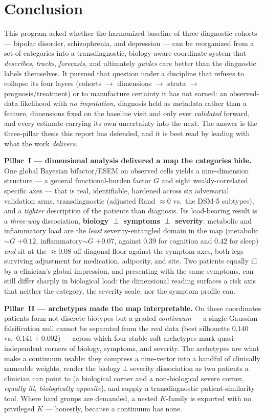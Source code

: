 \section{Conclusion}
\label{sec:conclusion}

This program asked whether the harmonized baseline of three diagnostic cohorts --- bipolar disorder,
schizophrenia, and depression --- can be reorganized from a set of categories into a transdiagnostic,
biology-aware coordinate system that \emph{describes}, \emph{tracks}, \emph{forecasts}, and ultimately
\emph{guides} care better than the diagnostic labels themselves. It pursued that question under a discipline
that refuses to collapse its four layers (cohorts $\to$ dimensions $\to$ strata $\to$ prognosis/treatment) or to
manufacture certainty it has not earned: an observed-data likelihood with \emph{no imputation}, diagnosis held
as metadata rather than a feature, dimensions fixed on the baseline visit and only ever \emph{validated}
forward, and every estimate carrying its own uncertainty into the next. The answer is the three-pillar thesis
this report has defended, and it is best read by leading with what the work \emph{delivers}.

\textbf{Pillar~I --- dimensional analysis delivered a map the categories hide.} One global Bayesian
bifactor/ESEM on observed cells yields a nine-dimension structure --- a general functional-burden factor $G$ and
eight weakly-correlated specific axes --- that is real, identifiable, hardened across six adversarial validation
arms, transdiagnostic (adjusted Rand $\approx 0$ vs.\ the DSM-5 subtypes), and a \emph{tighter} description of
the patients than diagnosis. Its load-bearing result is a \emph{three-way} dissociation,
\textbf{biology $\perp$ symptoms $\perp$ severity}: metabolic and inflammatory load are the \emph{least}
severity-entangled domain in the map (metabolic$\sim$$G$ $+0.12$, inflammatory$\sim$$G$ $+0.07$, against $0.39$
for cognition and $0.42$ for sleep) \emph{and} sit at the $\approx 0.08$ off-diagonal floor against the symptom
axes, both legs surviving adjustment for medication, adiposity, and site. Two patients equally ill by a
clinician's global impression, and presenting with the same symptoms, can still differ sharply in biological
load: the dimensional reading surfaces a risk axis that neither the category, the severity scale, nor the
symptom profile can.

\textbf{Pillar~II --- archetypes made the map interpretable.} On these coordinates patients form not discrete
biotypes but a graded \emph{continuum} --- a single-Gaussian falsification null cannot be separated from the
real data (best silhouette $0.140$ vs.\ $0.141\pm0.002$) --- across which four stable soft archetypes mark
quasi-independent corners of biology, symptoms, and severity. The archetypes are what make a continuum usable:
they compress a nine-vector into a handful of clinically nameable weights, render the biology$\perp$severity
dissociation as two patients a clinician can point to (a biological corner and a non-biological severe corner,
\emph{equally ill, biologically opposite}), and supply a transdiagnostic patient-similarity tool. Where hard
groups are demanded, a nested $K$-family is exported with no privileged $K$ --- honestly, because a continuum
has none.

